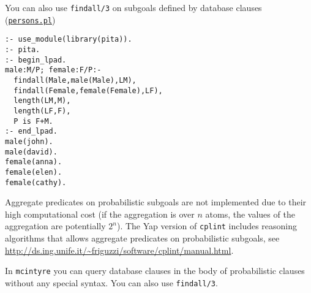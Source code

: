 You can also use \verb|findall/3| on subgoals defined by database clauses
(\href{http://cplint.lamping.unife.it/example/inference/persons.pl}{\texttt{persons.pl}})
\begin{verbatim}
:- use_module(library(pita)).
:- pita.
:- begin_lpad.
male:M/P; female:F/P:-
  findall(Male,male(Male),LM),
  findall(Female,female(Female),LF),
  length(LM,M),
  length(LF,F),
  P is F+M.
:- end_lpad.
male(john).
male(david).
female(anna).
female(elen).
female(cathy).
\end{verbatim}
Aggregate predicates on probabilistic subgoals are not implemented due to their high
computational cost (if the aggregation is over $n$ atoms, the values of the
aggregation are potentially $2^n$). The Yap version of \verb|cplint| includes
reasoning algorithms that allows aggregate predicates on probabilistic subgoals,
see \url{http://ds.ing.unife.it/~friguzzi/software/cplint/manual.html}.

In \verb|mcintyre| you can query database clauses in the body of probabilistic clauses without any special syntax. You can also 
use \verb|findall/3|.